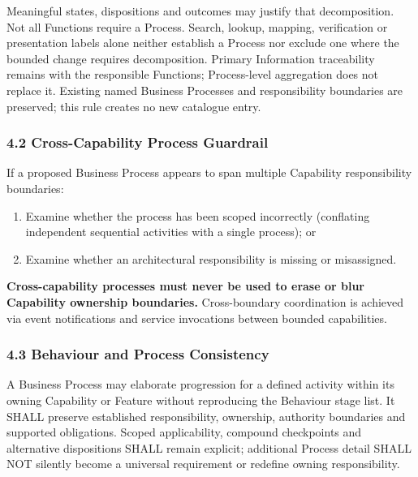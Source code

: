 Meaningful states, dispositions and outcomes may justify that decomposition. Not all Functions require a Process. Search, lookup, mapping, verification or presentation labels alone neither establish a Process nor exclude one where the bounded change requires decomposition. Primary Information traceability remains with the responsible Functions; Process-level aggregation does not replace it. Existing named Business Processes and responsibility boundaries are preserved; this rule creates no new catalogue entry.

\label{rad:metamodel:221}
\subsubsection*{4.2 Cross-Capability Process Guardrail}
\label{rad:metamodel:222}

If a proposed Business Process appears to span multiple Capability responsibility boundaries:

\label{rad:metamodel:223}

\begin{enumerate}

\item
Examine whether the process has been scoped incorrectly (conflating independent sequential activities with a single process); or



\item
Examine whether an architectural responsibility is missing or misassigned.



\end{enumerate}
\label{rad:metamodel:226}

\textbf{Cross-capability processes must never be used to erase or blur Capability ownership boundaries.} Cross-boundary coordination is achieved via event notifications and service invocations between bounded capabilities.

\label{rad:metamodel:228}
\subsubsection*{4.3 Behaviour and Process Consistency}
\label{rad:metamodel:230}

A Business Process may elaborate progression for a defined activity within its owning Capability or Feature without reproducing the Behaviour stage list. It SHALL preserve established responsibility, ownership, authority boundaries and supported obligations. Scoped applicability, compound checkpoints and alternative dispositions SHALL remain explicit; additional Process detail SHALL NOT silently become a universal requirement or redefine owning responsibility.

